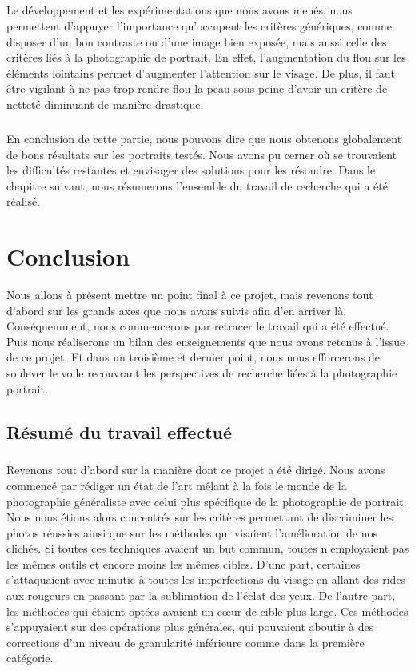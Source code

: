 \documentclass[11pt, french]{report-rd-info}
\begin{document}
\paragraph*{}
Le développement et les expérimentations que nous avons menés, nous permettent d'appuyer l'importance qu'occupent les critères génériques, comme disposer d'un bon contraste ou d'une image bien exposée, mais aussi celle des critères liés à la photographie de portrait. En effet, l'augmentation du flou sur les éléments lointains permet d'augmenter l'attention sur le visage. De plus, il faut être vigilant à ne pas trop rendre flou la peau sous peine d'avoir un critère de netteté diminuant de manière drastique.  
\paragraph*{}
En conclusion de cette partie, nous pouvons dire que nous obtenons globalement de bons résultats sur les portraits testés. Nous avons pu cerner où se trouvaient les difficultés restantes et envisager des solutions pour les résoudre. Dans le chapitre suivant, nous résumerons l'ensemble du travail de recherche qui a été réalisé.




\chapter{Conclusion}
\label{chap:Conclusion}
Nous allons à présent mettre un point final à ce projet, mais revenons tout d'abord sur les grands axes que nous avons suivis afin d'en arriver là. Conséquemment, nous commencerons par retracer le travail qui a été effectué. Puis nous réaliserons un bilan des enseignements que nous avons retenus à l'issue de ce projet. Et dans un troisième et dernier point, nous nous efforcerons de soulever le voile recouvrant les perspectives de recherche liées à la photographie portrait.

\section{Résumé du travail effectué}
\paragraph*{}
Revenons tout d'abord sur la manière dont ce projet a été dirigé. Nous avons commencé par rédiger un état de l'art mêlant à la fois le monde de la photographie généraliste avec celui plus spécifique de la photographie de portrait. Nous nous étions alors concentrés sur les critères permettant de discriminer les photos réussies ainsi que sur les méthodes qui visaient l'amélioration de nos clichés. Si toutes ces techniques avaient un but commun, toutes n'employaient pas les mêmes outils et encore moins les mêmes cibles. D'une part, certaines s'attaquaient avec minutie à toutes les imperfections du visage en allant des rides aux rougeurs en passant par la sublimation de l'éclat des yeux. De l'autre part, les méthodes qui étaient optées avaient un cœur de cible plus large. Ces méthodes s'appuyaient sur des opérations plus générales, qui pouvaient aboutir à des corrections d'un niveau de granularité inférieure comme dans la première catégorie. 
\end{document}
